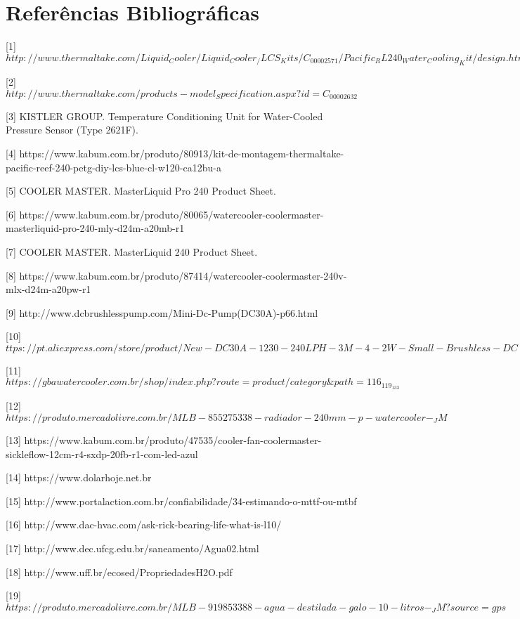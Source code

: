 \chapter{Referências Bibliográficas}


[1] $http://www.thermaltake.com/Liquid_Cooler/Liquid_Cooler_/LCS_Kits/C_00002571/Pacific_RL240_Water_Cooling_Kit/design.htm$

[2] $http://www.thermaltake.com/products-model_Specification.aspx?id=C_00002632$

[3] KISTLER GROUP. Temperature Conditioning Unit for Water-Cooled Pressure Sensor (Type 2621F). 

[4] https://www.kabum.com.br/produto/80913/kit-de-montagem-thermaltake-pacific-reef-240-petg-diy-lcs-blue-cl-w120-ca12bu-a

[5] COOLER MASTER. MasterLiquid Pro 240 Product Sheet. 

[6] https://www.kabum.com.br/produto/80065/watercooler-coolermaster-masterliquid-pro-240-mly-d24m-a20mb-r1

[7] COOLER MASTER. MasterLiquid 240 Product Sheet. 

[8] https://www.kabum.com.br/produto/87414/watercooler-coolermaster-240v-mlx-d24m-a20pw-r1

[9] http://www.dcbrushlesspump.com/Mini-Dc-Pump(DC30A)-p66.html

[10] $ttps://pt.aliexpress.com/store/product/New-DC30A-1230-240LPH-3M-4-2W-Small-Brushless-DC-Water-Pump-
Waterproof-Submersible-For-Fountain/515403_32608819489.html$

[11] $https://gbawatercooler.com.br/shop/index.php?route=product/category\&path=116_119_133$

[12] $https://produto.mercadolivre.com.br/MLB-855275338-radiador-240mm-p-watercooler-_JM$

[13] https://www.kabum.com.br/produto/47535/cooler-fan-coolermaster-sickleflow-12cm-r4-sxdp-20fb-r1-com-led-azul

[14] https://www.dolarhoje.net.br

[15] http://www.portalaction.com.br/confiabilidade/34-estimando-o-mttf-ou-mtbf

[16] http://www.dac-hvac.com/ask-rick-bearing-life-what-is-l10/

[17] http://www.dec.ufcg.edu.br/saneamento/Agua02.html

[18] http://www.uff.br/ecosed/PropriedadesH2O.pdf

[19] $https://produto.mercadolivre.com.br/MLB-919853388-agua-destilada-galo-10-litros-_JM?source=gps$

